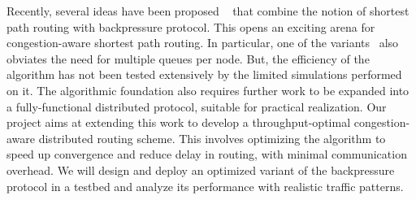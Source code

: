 Recently, several ideas have been proposed ~\cite{Srikant3, Austin1} that combine the notion of shortest path routing with backpressure protocol. This opens an exciting arena for congestion-aware shortest path routing. In particular, one of the variants~\cite{Srikant3} also obviates the need for multiple queues per node. But, the efficiency of the algorithm has not been tested extensively by the limited simulations performed on it. The algorithmic foundation also requires further work to be expanded into a fully-functional distributed protocol, suitable for practical realization. Our project aims at extending this work to develop a throughput-optimal congestion-aware distributed routing scheme. This involves optimizing the algorithm to speed up convergence and reduce delay in routing, with minimal communication overhead. We will design and deploy an optimized variant of the backpressure protocol in a testbed and analyze its performance with realistic traffic patterns.  
